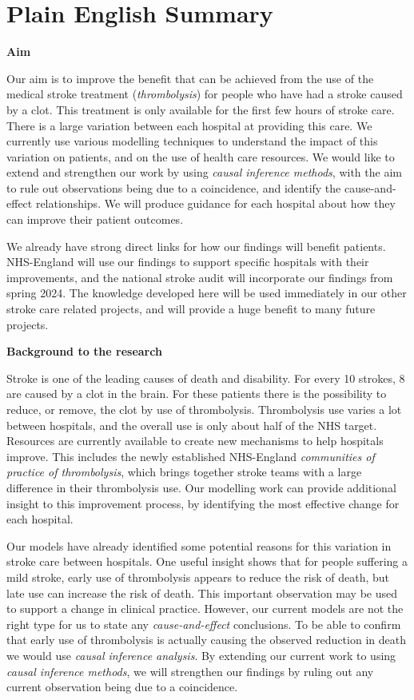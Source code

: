 \section*{Plain English Summary}

\textbf{Aim}

Our aim is to improve the benefit that can be achieved from the use of the medical stroke treatment (\textit{thrombolysis}) for people who have had a stroke caused by a clot. This treatment is only available for the first few hours of stroke care. There is a large variation between each hospital at providing this care. We currently use various modelling techniques to understand the impact of this variation on patients, and on the use of health care resources. We would like to extend and strengthen our work by using \textit{causal inference methods}, with the aim to rule out observations being due to a coincidence, and identify the cause-and-effect relationships. We will produce guidance for each hospital about how they can improve their patient outcomes. 

We already have strong direct links for how our findings will benefit patients. NHS-England will use our findings to support specific hospitals with their improvements, and the national stroke audit will incorporate our findings from spring 2024. The knowledge developed here will be used immediately in our other stroke care related projects, and will provide a huge benefit to many future projects. 

\textbf{Background to the research}

Stroke is one of the leading causes of death and disability. For every 10 strokes, 8 are caused by a clot in the brain. For these patients there is the possibility to reduce, or remove, the clot by use of thrombolysis. Thrombolysis use varies a lot between hospitals, and the overall use is only about half of the NHS target. Resources are currently available to create new mechanisms to help hospitals improve. This includes the newly established NHS-England \textit{communities of practice of thrombolysis}, which brings together stroke teams with a large difference in their thrombolysis use. Our modelling work can provide additional insight to this improvement process, by identifying the most effective change for each hospital.

Our models have already identified some potential reasons for this variation in stroke care between hospitals. One useful insight shows that for people suffering a mild stroke, early use of thrombolysis appears to reduce the risk of death, but late use can increase the risk of death. This important observation may be used to support a change in clinical practice. However, our current models are not the right type for us to state any \textit{cause-and-effect} conclusions. To be able to confirm that early use of thrombolysis is actually causing the observed reduction in death we would use \textit{causal inference analysis}. By extending our current work to using \textit{causal inference methods}, we will strengthen our findings by ruling out any current observation being due to a coincidence.

